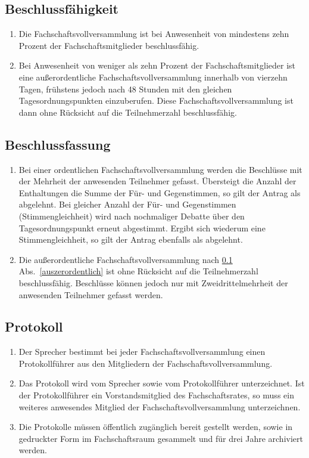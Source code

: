 \subsection{Beschlussfähigkeit}
\label{sec:beschlussfaehigkeit}
\begin{enumerate}
\item Die Fachschaftsvollversammlung ist bei Anwesenheit von mindestens zehn Prozent der Fachschaftsmitglieder beschlussfähig.
\item \label{auszerordentlich} Bei Anwesenheit von weniger als zehn Prozent der Fachschaftsmitglieder ist eine außerordentliche Fachschaftsvollversammlung innerhalb von vierzehn Tagen, frühstens jedoch nach 48 Stunden mit den gleichen Tagesordnungspunkten einzuberufen. Diese Fachschaftsvollversammlung ist dann ohne Rücksicht auf die Teilnehmerzahl beschlussfähig.
\end{enumerate}

\subsection{Beschlussfassung}
\begin{enumerate}
\item Bei einer ordentlichen Fachschaftsvollversammlung werden die Beschlüsse mit der Mehrheit der anwesenden Teilnehmer gefasst. Übersteigt die Anzahl der Enthaltungen die Summe der Für- und Gegenstimmen, so gilt der Antrag als abgelehnt. Bei gleicher Anzahl der Für- und Gegenstimmen (Stimmengleichheit) wird nach nochmaliger Debatte über den Tagesordnungspunkt erneut abgestimmt. Ergibt sich wiederum eine Stimmengleichheit, so gilt der Antrag ebenfalls als abgelehnt.
\item Die außerordentliche Fachschaftsvollversammlung nach \ref{sec:beschlussfaehigkeit} Abs.~\ref{auszerordentlich} ist ohne Rücksicht auf die Teilnehmerzahl beschlussfähig. Beschlüsse können jedoch nur mit Zweidrittelmehrheit der anwesenden Teilnehmer gefasst werden.
\end{enumerate}

\subsection{Protokoll}
\begin{enumerate}
\item Der Sprecher bestimmt bei jeder Fachschaftsvollversammlung einen Protokollführer aus den Mitgliedern der Fachschaftsvollversammlung.
\item Das Protokoll wird vom Sprecher sowie vom Protokollführer unterzeichnet. Ist der Protokollführer ein Vorstandsmitglied des Fachschaftsrates, so muss ein weiteres anwesendes Mitglied der Fachschaftsvollversammlung unterzeichnen.
\item Die Protokolle müssen öffentlich zugänglich bereit gestellt werden, sowie in gedruckter Form im Fachschaftsraum gesammelt und für drei Jahre archiviert werden.
\end{enumerate}
